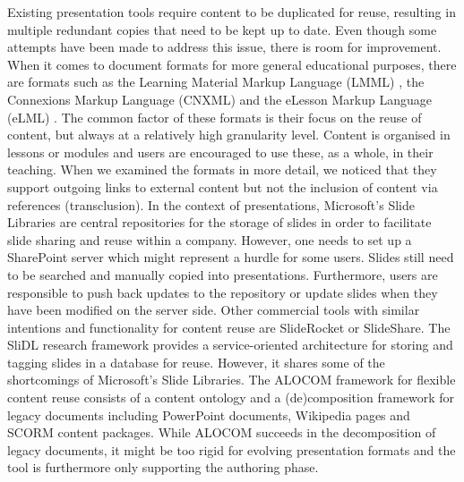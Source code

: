 \documentclass[a4paper,12pt]{report}
\begin{document}
    Existing presentation tools require content to be duplicated for reuse,
    resulting in multiple redundant copies that need to be kept up to date.
    Even though some attempts have been made to address this issue, there is
    room for improvement. When it comes to document formats for more general
    educational purposes, there are formats such as the Learning Material
    Markup Language (LMML) \citep{suss-1}, the Connexions Markup Language
    (CNXML) and the eLesson Markup Language (eLML) \citep{fisler-1}. The common
    factor of these formats is their focus on the reuse of content, but always
    at a relatively high granularity level. Content is organised in lessons or
    modules and users are encouraged to use these, as a whole, in their
    teaching. When we examined the formats in more detail, we noticed that they
    support outgoing links to external content but not the inclusion of content
    via references (transclusion). In the context of presentations, Microsoft's
    Slide Libraries are central repositories for the storage of slides in order
    to facilitate slide sharing and reuse within a company. However, one needs
    to set up a SharePoint server which might represent a hurdle for some
    users. Slides still need to be searched and manually copied into
    presentations. Furthermore, users are responsible to push back updates to
    the repository or update slides when they have been modified on the server
    side. Other commercial tools with similar intentions and functionality for
    content reuse are SlideRocket or SlideShare. The SliDL \citep{canos-1}
    research framework provides a service-oriented architecture for storing and
    tagging slides in a database for reuse. However, it shares some of the
    shortcomings of Microsoft's Slide Libraries. The ALOCOM \citep{verbert-1}
    framework for flexible content reuse consists of a content ontology and a
    (de)composition framework for legacy documents including PowerPoint
    documents, Wikipedia pages and SCORM content packages. While ALOCOM
    succeeds in the decomposition of legacy documents, it might be too rigid
    for evolving presentation formats and the tool is furthermore only
    supporting the authoring phase.
\end{document}
